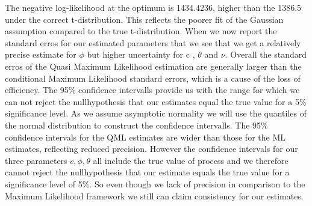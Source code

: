 \documentclass[12pt]{article}
\begin{document}
The negative log-likelihood at the optimum is 1434.4236, higher than the 1386.5 under the correct t-distribution.
This reflects the poorer fit of the Gaussian assumption compared to the true t-distribution.
When we now report the standard erros for our estimated parameters that we  see that we get a relatively precise estimate for $\phi$ but higher uncertainty for c , $\theta$ and $\nu$.
Overall the standard erros of the Quasi Maximum Likelihood estimation are generally larger than the conditional Maximum Likelihood standard errors, which is a cause of the loss of efficiency. 
The 95\% confidence intervalls provide us with the range for which we can not reject the nullhypothesis that our estimates equal the true value for a 5\% significance level.
As we assume asymptotic normality we will use the quantiles of the normal distribution to construct the confidence intervalls.
The 95\% confidence intervals for the QML estimates are wider than those for the ML estimates, reflecting reduced precision.
However the confidence intervals for our three parameters $c, \phi, \theta$ all include the true value of process and we therefore cannot reject the nullhypothesis that 
our estimate equals the true value for a significance level of 5\%.
So even though we lack of precision in comparison to the Maximum Likelihood framework we still can claim consistency for our estimates.
\end{document}
